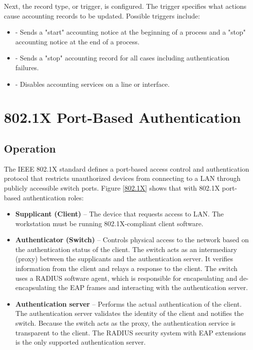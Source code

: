Next, the record type, or trigger, is configured. The trigger specifies what actions cause accounting records to be updated. Possible triggers include:

\begin{itemize}
\item {} - Sends a "start" accounting notice at the beginning of a process and a "stop" accounting notice at the end of a process.
\item {} - Sends a "stop" accounting record for all cases including authentication failures.
\item {} - Disables accounting services on a line or interface.
\end{itemize}
    

\section{802.1X Port-Based Authentication}

\subsection{Operation}

The IEEE 802.1X standard defines a port-based access control and authentication protocol that restricts unauthorized devices from connecting to a LAN through publicly accessible switch ports. Figure \ref{802.1X} shows that with 802.1X port-based authentication roles:

\begin{itemize}
\item \textbf{Supplicant (Client)} -- The device that requests access to LAN. The workstation must be running 802.1X-compliant client software. 
\item \textbf{Authenticator (Switch)} -- Controls physical access to the network based on the authentication status of the client. The switch acts as an intermediary (proxy) between the supplicants and the authentication server. It verifies information from the client and relays a response to the client. The switch uses a RADIUS software agent, which is responsible for encapsulating and de-encapsulating the EAP frames and interacting with the authentication server.
\item \textbf{Authentication server} -- Performs the actual authentication of the client. The authentication server validates the identity of the client and notifies the switch. Because the switch acts as the proxy, the authentication service is transparent to the client. The RADIUS security system with EAP extensions is the only supported authentication server.
\end{itemize}

